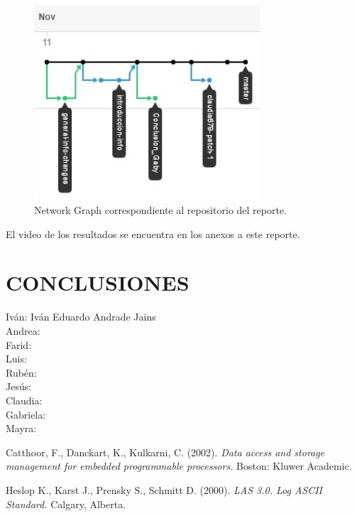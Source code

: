 \documentclass[12pt, letterpaper]{article}
\begin{document}
\begin{figure}[H]
    \centering
    \includegraphics[width=0.75\textwidth]{img/desarrollo/DOC_NETWORK.jpg}
    \caption{Network Graph correspondiente al repositorio del reporte.}
\end{figure}

El video de los resultados se encuentra en los anexos a este reporte.
\pagebreak

\section{CONCLUSIONES}
Iván: Iván Eduardo Andrade Jains \\
Andrea: \\
Farid: \\
Luis: \\
Rubén: \\
Jesús: \\
Claudia: \\
Gabriela: \\
Mayra: \\
\pagebreak

\begin{thebibliography}{2}
    Catthoor, F., Danckart, K., Kulkarni, C.
    (2002). 
    \textit{Data access and storage management for embedded programmable processors.} 
    Boston: Kluwer Academic.

    Heslop K., Karst J., Prensky S., Schmitt D.
    (2000).
    \textit{LAS 3.0. Log ASCII Standard.}
    Calgary, Alberta.
\end{thebibliography}
\end{document}
